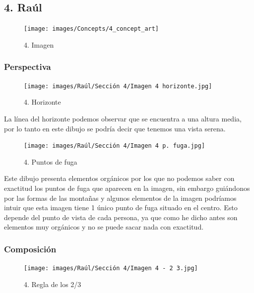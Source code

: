 \documentclass[12pt]{article}
\begin{document}

    \subsection{4. Raúl}
    
    \begin{figure}[H]
      \centering
      \texttt{[image: images/Concepts/4\_concept\_art]}
      \caption{\small 4. Imagen}
\end{figure}

        \subsubsection{Perspectiva}
        
  \begin{figure}[H]
      \centering
      \texttt{[image: images/Raúl/Sección 4/Imagen 4 horizonte.jpg]}
      \caption{\small 4. Horizonte}
\end{figure}       

La línea del horizonte podemos observar que se encuentra a una altura media, por lo tanto en este dibujo se podría decir que tenemos una vista serena.

\begin{figure}[H]
      \centering
      \texttt{[image: images/Raúl/Sección 4/Imagen 4 p. fuga.jpg]}
      \caption{\small 4. Puntos de fuga}
\end{figure}  

Este dibujo presenta elementos orgánicos por los que no podemos saber con exactitud los puntos de fuga que aparecen en la imagen, sin embargo guiándonos por las formas de las montañas y algunos elementos de la imagen podríamos intuir que esta imagen tiene 1 único punto de fuga situado en el centro. Esto depende del punto de vista de cada persona, ya que como he dicho antes son elementos muy orgánicos y no se puede sacar nada con exactitud.

        \subsubsection{Composición}
        
\begin{figure}[H]
      \centering
      \texttt{[image: images/Raúl/Sección 4/Imagen 4 - 2 3.jpg]}
      \caption{\small 4. Regla de los 2/3}
\end{figure}  
\end{document}
